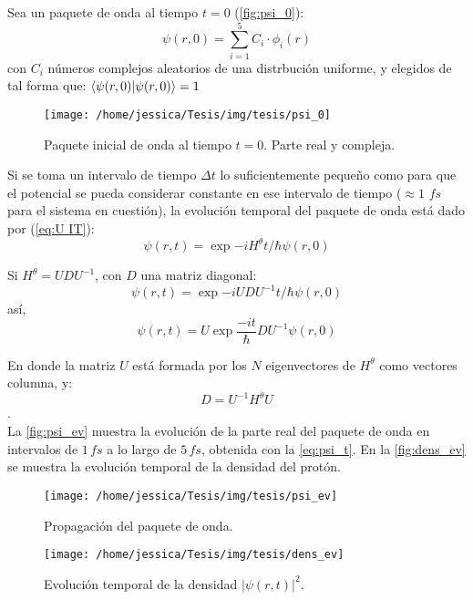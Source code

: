 Sea un paquete de onda al tiempo $t=0$ (\autoref{fig:psi_0}): 
\begin{equation}
  \label{eq:psi_0}
\psi(r,0)=\sum_{i=1}^5C_i \cdot \phi_{i}(r)
\end{equation}
con $C_i$ números complejos aleatorios de una distrbución uniforme, y elegidos de tal forma que: $\bra{\psi(r,0)}\ket{\psi(r,0)}=1$
\begin{figure}[!htbp]
  \centering
  \texttt{[image: /home/jessica/Tesis/img/tesis/psi\_0]}
  \caption{Paquete inicial de onda al tiempo $t=0$. Parte real y compleja.}
  \label{fig:psi_0}
\end{figure}

Si se toma un intervalo de tiempo $\Delta t$ lo suficientemente pequeño como para que el potencial se pueda considerar constante en ese intervalo de tiempo ($\approx 1\,\,fs$ para el sistema en cuestión), la evolución temporal del paquete de onda está dado por (\autoref{eq:U IT}):
\begin{equation}
  \label{eq:wp_ev}
  \psi(r,t)=\exp{-iH^{\theta}t/\hbar}\psi(r,0)
\end{equation}

Si $H^{\theta} = UDU^{-1}$, con $D$ una matriz diagonal:
$$ \psi(r,t) = \exp{-iUDU^{-1}t/\hbar}\psi(r,0)$$  
así,
\begin{equation}
  \label{eq:psi_t}
\psi(r,t) = U\exp{\frac{-it}{\hbar}D}U^{-1}\psi(r,0)
\end{equation}

En donde la matriz $U$ está formada por los $N$ eigenvectores de $H^{\theta}$ como vectores columna, y:
$$D=U^{-1}H^{\theta}U$$.
\\

La \autoref{fig:psi_ev} muestra la evolución de la parte real del paquete de onda en intervalos de $1\,fs$ a lo largo de $5\,fs$, obtenida con la \autoref{eq:psi_t}. En la \autoref{fig:dens_ev} se muestra la evolución temporal de la densidad del protón.

\begin{figure}[!htbp]
  \centering
  \texttt{[image: /home/jessica/Tesis/img/tesis/psi\_ev]}
  \caption{Propagación del paquete de onda.}
  \label{fig:psi_ev}
\end{figure}

\begin{figure}[!htbp]
  \centering
  \texttt{[image: /home/jessica/Tesis/img/tesis/dens\_ev]}
  \caption{Evolución temporal de la densidad $|\psi(r,t)|^2$.}
  \label{fig:dens_ev}
\end{figure}
